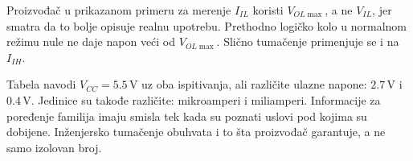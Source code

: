 Proizvođač u prikazanom primeru za merenje $I_{IL}$ koristi $V_{OL\max}$, a ne $V_{IL}$, jer smatra da to bolje opisuje realnu upotrebu. Prethodno logičko kolo u normalnom režimu nule ne daje napon veći od $V_{OL\max}$. Slično tumačenje primenjuje se i na $I_{IH}$.

Tabela navodi $V_{CC}=5.5\,\mathrm V$ uz oba ispitivanja, ali različite ulazne napone: $2.7\,\mathrm V$ i $0.4\,\mathrm V$. Jedinice su takođe različite: mikroamperi i miliamperi. Informacije za poređenje familija imaju smisla tek kada su poznati uslovi pod kojima su dobijene. Inženjersko tumačenje obuhvata i to šta proizvođač garantuje, a ne samo izolovan broj.
